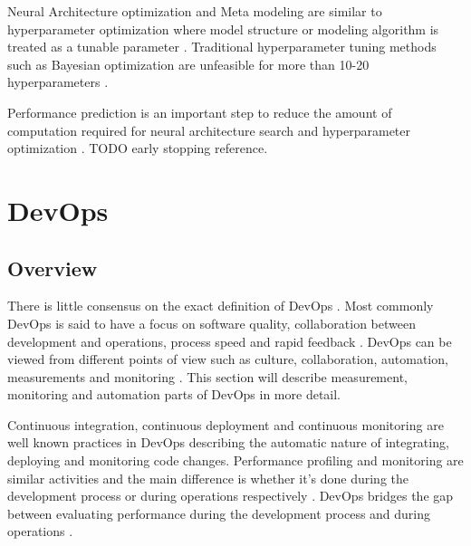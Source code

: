 Neural Architecture optimization and Meta modeling are similar to hyperparameter optimization where model structure or modeling algorithm is treated as a tunable parameter \parencite{bakerAcceleratingNeuralArchitecture2017}. Traditional hyperparameter tuning methods such as Bayesian optimization are unfeasible for more than 10-20 hyperparameters \parencite{maclaurinGradientbasedHyperparameterOptimization2015}.

Performance prediction is an important step to reduce the amount of computation required for neural architecture search and hyperparameter optimization \parencite{bakerAcceleratingNeuralArchitecture2017}. TODO early stopping reference.



\section{DevOps} %
\label{sec:devops}

\subsection{Overview}


There is little consensus on the exact definition of DevOps \parencite{smedsDevOpsDefinitionPerceived2015}. Most commonly DevOps is said to have a focus on software quality, collaboration between development and operations, process speed and rapid feedback \parencite{mishraDevOpsSoftwareQuality2020,wallerIncludingPerformanceBenchmarks2015, pereraImproveSoftwareQuality2017}. DevOps can be viewed from different points of view such as culture, collaboration, automation, measurements and monitoring \parencite{mishraDevOpsSoftwareQuality2020, wallerIncludingPerformanceBenchmarks2015}. This section will describe measurement, monitoring and automation parts of DevOps in more detail.



Continuous integration, continuous deployment and continuous monitoring are well known practices in DevOps \parencite{wallerIncludingPerformanceBenchmarks2015} describing the automatic nature of integrating, deploying and monitoring code changes. Performance profiling and monitoring are similar activities and the main difference is whether it's done during the development process or during operations respectively \parencite{wallerIncludingPerformanceBenchmarks2015}. DevOps bridges the gap between evaluating performance during the development process and during operations \parencite{brunnertPerformanceorientedDevOpsResearch2015}.

